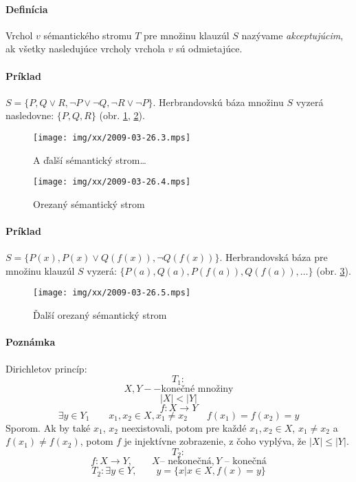 \paragraph{Definícia} Vrchol $v$ sémantického  stromu
$T$ pre  množinu klauzúl $S$ nazývame \emph{akceptujúcim}, ak všetky nasledujúce
vrcholy vrchola $v$ sú odmietajúce.

\paragraph{Príklad} $S= \{ P, Q \lor R, \neg P \lor \neg Q, \neg R \lor \neg P
\}$. Herbrandovskú báza množinu $S$ vyzerá nasledovne: $\{P, Q, R\}$ (obr.
\ref{0326_tree3}, \ref{0326_tree_cut}).

\begin{figure}[h]
	\centering\texttt{[image: img/xx/2009-03-26.3.mps]}
	\caption{A ďalší sémantický strom\ldots}
	\label{0326_tree3}
\end{figure}

\begin{figure}[h]
	\centering\texttt{[image: img/xx/2009-03-26.4.mps]}
	\caption{Orezaný sémantický strom}
	\label{0326_tree_cut}
\end{figure}


\paragraph{Príklad} $S=\{ P(x), P(x) \lor Q(f(x)), \neg Q(f(x)) \}$.
Herbrandovská báza pre množinu klauzúl $S$ vyzerá: $\{ P(a), Q(a), P(f(a)),
Q(f(a)), \ldots \}$ (obr. \ref{0326_tree_cut2}). %


\begin{figure}[h]
	\centering\texttt{[image: img/xx/2009-03-26.5.mps]}
	\caption{Ďalší orezaný sémantický strom}
	\label{0326_tree_cut2}
\end{figure}

\paragraph{Poznámka} Dirichletov princíp:
$$T_1:$$
$$X, Y -- \mbox{konečné množiny}$$
$$ |X| < |Y| $$
$$ f: X \rightarrow Y$$
$$ \exists y \in Y_1\qquad x_1,x_2 \in X, x_1 \neq x_2 \qquad f(x_1) = f(x_2) =
y$$
Sporom. Ak by také $x_1$, $x_2$ neexistovali, potom pre každé $x_1, x_2 \in X$,
$x_1 \neq x_2$ a $f(x_1) \neq f(x_2)$, potom $f$ je injektívne zobrazenie, z
čoho vyplýva, že $|X| \leq |Y|$.
$$T_2: $$
$$ f: X \rightarrow Y,\qquad X\mbox{-- nekonečná}, Y\mbox{ -- konečná} $$
$$T_2: \exists y\in Y, \qquad y=\{x|x\in X, f(x)=y\}$$

